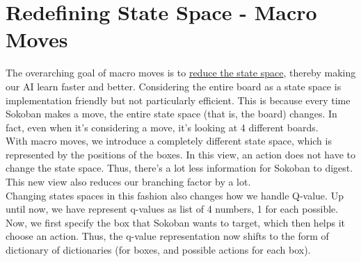\documentclass{article}
\begin{document}
\begin{algorithm}
\begin{algorithmic}
        
    
    \end{algorithmic}
\end{algorithm}

\newpage

\section{Redefining State Space - Macro Moves}
The overarching goal of macro moves is to \underline{reduce the state space}, thereby making our AI learn faster and better. Considering the entire board as a state space is implementation friendly but not particularly efficient. This is because every time Sokoban makes a move, the entire state space (that is, the board) changes. In fact, even when it's considering a move, it's looking at 4 different boards. \\
With macro moves, we introduce a completely different state space, which is represented by the positions of the boxes. In this view, an action does not have to change the state space. Thus, there's a lot less information for Sokoban to digest. This new view also reduces our branching factor by a lot. \\
Changing states spaces in this fashion also changes how we handle Q-value. Up until now, we have represent q-values as list of 4 numbers, 1 for each possible. Now, we first specify the box that Sokoban wants to target, which then helps it choose an action. Thus, the q-value representation now shifts to the form of dictionary of dictionaries (for boxes, and possible actions for each box). 
\end{document}

